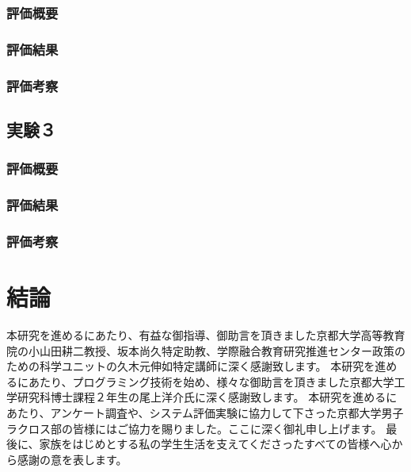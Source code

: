 \documentclass[sotsuron]{kuee}
\begin{document}
\subsection{評価概要}
\subsection{評価結果}
\subsection{評価考察}
\section{実験３}
\subsection{評価概要}
\subsection{評価結果}
\subsection{評価考察}

\chapter{結論}


\begin{acknowledgements}
 本研究を進めるにあたり、有益な御指導、御助言を頂きました京都大学高等教育院の小山田耕二教授、坂本尚久特定助教、学際融合教育研究推進センター政策のための科学ユニットの久木元伸如特定講師に深く感謝致します。
本研究を進めるにあたり、プログラミング技術を始め、様々な御助言を頂きました京都大学工学研究科博士課程２年生の尾上洋介氏に深く感謝致します。
本研究を進めるにあたり、アンケート調査や、システム評価実験に協力して下さった京都大学男子ラクロス部の皆様にはご協力を賜りました。ここに深く御礼申し上げます。
最後に、家族をはじめとする私の学生生活を支えてくださったすべての皆様へ心から感謝の意を表します。
\end{acknowledgements}








\appendix
\end{document}
